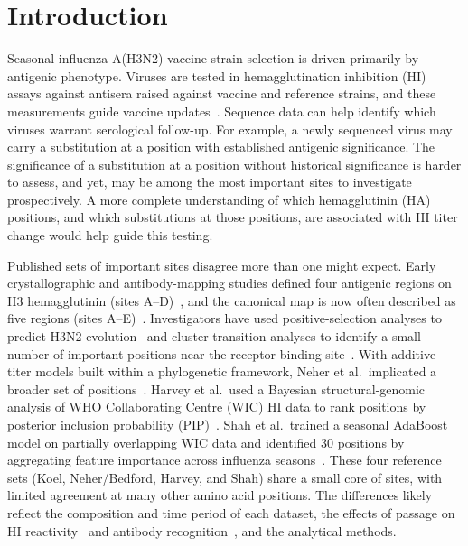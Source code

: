 \documentclass[12pt]{article}
\begin{document}
\clearpage
\section{Introduction}

Seasonal influenza A(H3N2) vaccine strain selection is driven primarily by antigenic phenotype. Viruses are tested in hemagglutination inhibition (HI) assays against antisera raised against vaccine and reference strains, and these measurements guide vaccine updates~\cite{Russell2008Science, Bedford2015Nature, Smith2004Science}. Sequence data can help identify which viruses warrant serological follow-up. For example, a newly sequenced virus may carry a substitution at a position with established antigenic significance. The significance of a substitution at a position without historical significance is harder to assess, and yet, may be among the most important sites to investigate prospectively. A more complete understanding of which hemagglutinin (HA) positions, and which substitutions at those positions, are associated with HI titer change would help guide this testing.

Published sets of important sites disagree more than one might expect. Early crystallographic and antibody-mapping studies defined four antigenic regions on H3 hemagglutinin (sites A--D)~\cite{Wiley1981Nature}, and the canonical map is now often described as five regions (sites A--E)~\cite{Koel2013Science}. Investigators have used positive-selection analyses to predict H3N2 evolution~\cite{bush1999predicting} and cluster-transition analyses to identify a small number of important positions near the receptor-binding site~\cite{Koel2013Science}. With additive titer models built within a phylogenetic framework, Neher et al.\ implicated a broader set of positions~\cite{Neher2016PNAS}. Harvey et al.\ used a Bayesian structural-genomic analysis of WHO Collaborating Centre (WIC) HI data to rank positions by posterior inclusion probability (PIP)~\cite{Harvey2023PLoSComputBiol}. Shah et al.\ trained a seasonal AdaBoost model on partially overlapping WIC data and identified 30 positions by aggregating feature importance across influenza seasons~\cite{shah2024seasonal}. These four reference sets (Koel, Neher/Bedford, Harvey, and Shah) share a small core of sites, with limited agreement at many other amino acid positions. The differences likely reflect the composition and time period of each dataset, the effects of passage on HI reactivity~\cite{Parker2016JGenVirol} and antibody recognition~\cite{Zost2017PNAS}, and the analytical methods.
\end{document}
